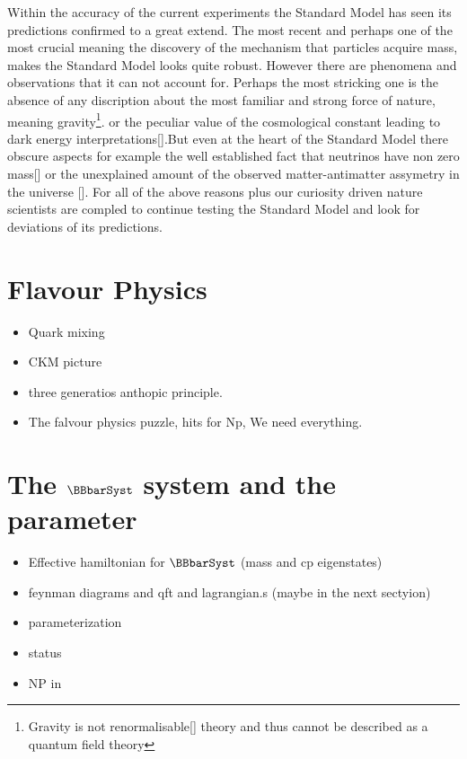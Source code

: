Within the accuracy of the current experiments the Standard Model has seen its predictions confirmed to a great extend.
The most recent and perhaps one of the most crucial meaning the discovery of the mechanism that particles acquire mass, makes the Standard
Model looks quite robust. However there are phenomena and observations that it can not account for. Perhaps the most stricking one is the
absence of any discription about the most familiar and strong force of nature, meaning gravity\footnote{Gravity is not renormalisable[\cite{}]
theory and thus cannot be described as a quantum field theory}. or the peculiar value of the cosmological constant leading to dark energy
interpretations[\cite{}].But even at the heart of the Standard Model there obscure aspects for example the well established fact that neutrinos
have non zero mass[\cite{}] or the unexplained amount of the observed matter-antimatter assymetry in the universe [\cite{}]. For all of the
above reasons plus our curiosity driven nature scientists are compled to continue testing the Standard Model and look for deviations of
its predictions.



\section{Flavour Physics}
\begin{itemize}
  \item Quark mixing
  \item CKM picture
  \item three generatios anthopic principle.
  \item The falvour physics puzzle, hits for Np, We need everything.
\end{itemize}

\section{The $\BBbarSyst$ system and the \phis parameter}
\label{Phenomenology}

\begin{itemize}
  \item Effective hamiltonian for $\BBbarSyst$ (mass and cp eigenstates)
  \item feynman diagrams and qft and lagrangian.s (maybe in the next sectyion)
  \item \phis parameterization
  \item \phis status
  \item NP in \phis
\end{itemize}

